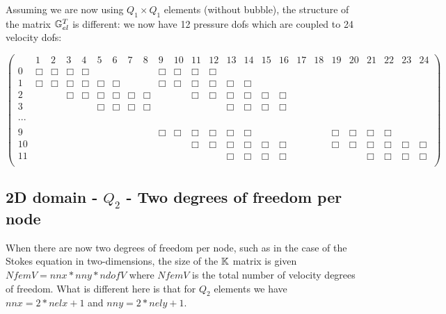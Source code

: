 Assuming we are now using $Q_1\times Q_1$ elements (without bubble), 
the structure of the matrix ${\mathbb{G}}_{el}^T$ is different: we now have 12 pressure dofs 
which are coupled to 24 velocity dofs:
\begin{scriptsize}
\begin{equation}
\left(
\begin{array}{ccccccccccccccccccccccccc}
 & 1 & 2 & 3 & 4 & 5 & 6 & 7 & 8 & 9 & 10 & 11 & 12 & 13 & 14 & 15 & 16 & 17 & 18 & 19 & 20 & 21 & 22 & 23 & 24    \\
0 &\Box&\Box & \Box&\Box &  &  &  &  & \Box&\Box & \Box&\Box &  &  &  &  &  &  &  &  &  &  &  &  \\
1 & \Box&\Box & \Box&\Box & \Box  & \Box  &  &  & \Box&\Box & \Box&\Box & \Box  & \Box  &  &  &  &  &  &  &  &  &  & \\
2 &  & & \Box&\Box & \Box  & \Box  & \Box  & \Box  & & & \Box&\Box & \Box  & \Box  & \Box  &\Box  &  &  &  &  &  &  &  & \\ 
3 &  & & &  & \Box  & \Box  & \Box  & \Box  & & & & & \Box  & \Box  & \Box  &\Box  &  &  &  &  &  &  &  & \\ 
\\
... \\
\\
9 & & & & & & & & &\Box &\Box &\Box &\Box & \Box  & \Box &  &  & & &\Box &\Box & \Box &\Box & &  \\
10 & & & & & & & & & & &\Box &\Box & \Box  & \Box & \Box & \Box & & &\Box &\Box & \Box &\Box &\Box & \Box \\
11 & & & & & & & & & & & & & \Box  & \Box & \Box & \Box & & & & & \Box &\Box &\Box & \Box \\
\end{array}
\right)
\end{equation} 
\end{scriptsize}

\subsection{2D domain - $Q_2$ - Two degrees of freedom per node}


When there are now two degrees of freedom per node, such as in the case 
of the Stokes equation in two-dimensions, the size of the ${\mathbb{K}}$ matrix 
is given $NfemV=nnx*nny*ndofV$ where $NfemV$ is the total number of 
velocity degrees of freedom. What is different here is that for $Q_2$
elements we have $nnx=2*nelx+1$ and $nny=2*nely+1$.

